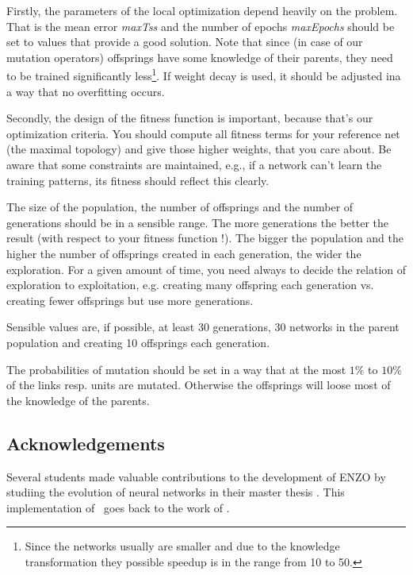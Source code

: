 Firstly, the parameters of the local optimization  depend heavily on the
problem. That is the mean error {\it maxTss} and the number of epochs
{\it maxEpochs} should be set to values that provide a good solution.
Note that since (in case of our mutation operators) offsprings have some knowledge of their parents,
they need to be trained significantly less\footnote{Since the networks usually are smaller and due to the knowledge transformation they possible speedup is in the range from 10 to 50.}.
If weight decay is used, it should be adjusted ina a way that no overfitting occurs. 

Secondly, the design of the fitness function is important, because
that's our optimization criteria. You should compute all fitness terms
for your reference net (the maximal topology)  and give those higher weights,
that you care about. Be aware that some constraints are maintained, e.g.,
if a network can't learn the training patterns, its fitness should reflect this
clearly. 

The size of the population, the number of offsprings and the number
of generations should be  in a sensible range.
The more generations the better the result (with respect to your fitness function !).
The bigger the population and the higher the number of offsprings created in each
generation, the wider the exploration.
For a given amount of time, you need always to decide the relation of
exploration to exploitation, e.g. creating many offspring each generation vs. creating fewer offsprings but   use more generations.

Sensible values are, if possible, at least 30 generations,
30 networks in the parent population and creating 10 offsprings
each generation.

The probabilities of mutation should be set in a way that at the most $1\%$ to $10\%$
of the links resp. units are mutated. Otherwise the offsprings will loose most of
the knowledge of the parents. 

\subsection*{Acknowledgements}

Several students made valuable contributions to the development of 
ENZO by studiing the evolution of neural networks in their master
thesis \cite{weisbrod92,zagorski94,schaefer94,schubert95}. 
This implementation of \ENZO\ goes back to
the work of \cite{schaefer94,schubert95}.







